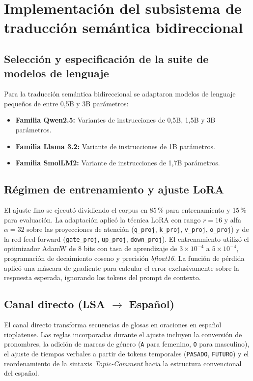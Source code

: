 \section{Implementación del subsistema de traducción semántica bidireccional}

\subsection{Selección y especificación de la suite de modelos de lenguaje}
Para la traducción semántica bidireccional se adaptaron modelos de lenguaje pequeños de entre 0,5B y 3B parámetros:
\begin{itemize}
    \item \textbf{Familia Qwen2.5:} Variantes de instrucciones de 0,5B, 1,5B y 3B parámetros.
    \item \textbf{Familia Llama 3.2:} Variante de instrucciones de 1B parámetros.
    \item \textbf{Familia SmolLM2:} Variante de instrucciones de 1,7B parámetros.
\end{itemize}

\subsection{Régimen de entrenamiento y ajuste LoRA}
El ajuste fino se ejecutó dividiendo el corpus en 85\,\% para entrenamiento y 15\,\% para evaluación. La adaptación aplicó la técnica LoRA con rango $r = 16$ y alfa $\alpha = 32$ sobre las proyecciones de atención (\texttt{q\_proj}, \texttt{k\_proj}, \texttt{v\_proj}, \texttt{o\_proj}) y de la red feed-forward (\texttt{gate\_proj}, \texttt{up\_proj}, \texttt{down\_proj}). El entrenamiento utilizó el optimizador AdamW de 8 bits con tasa de aprendizaje de $3 \times 10^{-4}$ a $5 \times 10^{-4}$, programación de decaimiento coseno y precisión \textit{bfloat16}. La función de pérdida aplicó una máscara de gradiente para calcular el error exclusivamente sobre la respuesta esperada, ignorando los tokens del prompt de contexto.

\subsection{Canal directo (LSA $\rightarrow$ Español)}
El canal directo transforma secuencias de glosas en oraciones en español rioplatense. Las reglas incorporadas durante el ajuste incluyen la conversión de pronombres, la adición de marcas de género (\texttt{A} para femenino, \texttt{O} para masculino), el ajuste de tiempos verbales a partir de tokens temporales (\texttt{PASADO}, \texttt{FUTURO}) y el reordenamiento de la sintaxis \textit{Topic-Comment} hacia la estructura convencional del español.

